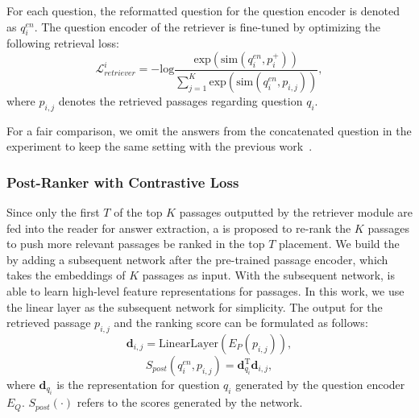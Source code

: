 For each question, the reformatted question for the question encoder is denoted as $q_i^{en}$.
The question encoder of the retriever is fine-tuned by optimizing the following retrieval loss:
\begin{equation}\label{eq:retriever}
    \mathcal{L}^i_{retriever}=-\mathrm{log}\frac{\mathrm{exp}(\mathrm{sim}(q_i^{en},p_i^+))}{\sum_{j=1}^{K}\mathrm{exp}(\mathrm{sim}(q_i^{en},p_{i,j}))},
\end{equation}
where $p_{i,j}$ denotes the retrieved passages regarding question $q_i$.

For a fair comparison, we omit the answers from the concatenated question in the experiment to keep the same setting with the previous work~\cite{qu2020open}.
\subsubsection{Post-Ranker with Contrastive Loss}
Since only the first $T$ of the top $K$ passages outputted by the retriever module are fed into the reader for answer extraction, a {\rerankname} is proposed to re-rank the $K$ passages to push more relevant passages be ranked in the top $T$ placement.
We build the {\rerankname} by adding a subsequent network after the pre-trained passage encoder, which takes the embeddings of $K$ passages as input. With the subsequent network, {\rerankname} is able to learn high-level feature representations for passages.
In this work, we use the linear layer as the subsequent network for simplicity. The output for the retrieved passage $p_{i,j}$ and the ranking score can be formulated as follows:
\vspace{-0.1in}
\begin{equation}
    \mathbf{d}_{i,j} = \mathrm{LinearLayer}(E_P(p_{i,j})),
\end{equation}
\begin{equation}\label{eq:score_post}
    S_{post}(q_i^{en},p_{i,j})=\mathbf{d}_{q_i}^{\mathrm{T}}\mathbf{d}_{i,j},
\end{equation}
where $\mathbf{d}_{q_i}$ is the representation for question $q_i$ generated by the question encoder $E_Q$. $S_{post}(\cdot)$ refers to the scores generated by the {\rerankname} network.


